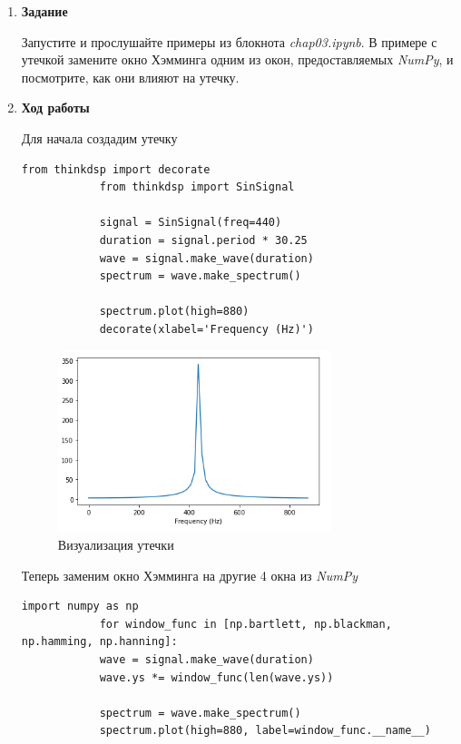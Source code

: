 \documentclass[a4paper,12pt]{article}
\begin{document}
	\begin{enumerate}
		
		\item \textbf{Задание}
		
		Запустите и прослушайте примеры из блокнота \textit{chap03.ipynb}.
		В примере с утечкой замените окно Хэмминга одним из окон, предоставляемых \textit{NumPy}, и посмотрите, как они влияют на утечку.
		
		
		\item \textbf{Ход работы}
		
		Для начала создадим утечку
		\begin{lstlisting}[caption=Пример утечки]
			from thinkdsp import decorate
			from thinkdsp import SinSignal
			
			signal = SinSignal(freq=440)
			duration = signal.period * 30.25
			wave = signal.make_wave(duration)
			spectrum = wave.make_spectrum()
			
			spectrum.plot(high=880)
			decorate(xlabel='Frequency (Hz)')
		\end{lstlisting}
		
		\begin{figure}[H]
			\centering
			\includegraphics[width=0.75\textwidth]{1_1.png}
			\caption{Визуализация утечки}
			\label{fig:1.1}
		\end{figure}
		
		Теперь заменим окно Хэмминга на другие 4 окна из \textit{NumPy}
		\begin{lstlisting}[caption=Создание 4х новых окон]
			import numpy as np
			for window_func in [np.bartlett, np.blackman, np.hamming, np.hanning]:
			wave = signal.make_wave(duration)
			wave.ys *= window_func(len(wave.ys))
			
			spectrum = wave.make_spectrum()
			spectrum.plot(high=880, label=window_func.__name__)
			

\end{lstlisting}
\end{enumerate}
\end{document}
